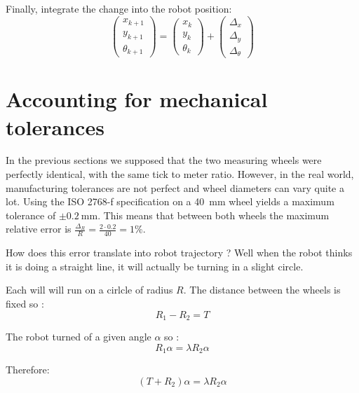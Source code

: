 \documentclass[a4paper]{paper}
\begin{document}
Finally, integrate the change into the robot position:
\begin{equation}
    \begin{pmatrix}
        x_{k+1}\\
        y_{k+1}\\
        \theta_{k+1}
    \end{pmatrix}
    =
    \begin{pmatrix}
        x_{k}\\
        y_{k}\\
        \theta_{k}
    \end{pmatrix}
    +
    \begin{pmatrix}
        \Delta_x\\\Delta_y\\\Delta_\theta
    \end{pmatrix}
\end{equation}


\section{Accounting for mechanical tolerances}
In the previous sections we supposed that the two measuring wheels were perfectly identical, with the same tick to meter ratio.
However, in the real world, manufacturing tolerances are not perfect and wheel diameters can vary quite a lot.
Using the ISO 2768-f specification on a \SI{40}{\milli\meter} wheel yields a maximum tolerance of $\pm \SI{0.2}{\milli\meter}$.
This means that between both wheels the maximum relative error is $\frac{\Delta_R}{R} = \frac{2 \cdot 0.2}{40} = 1\% $.

How does this error translate into robot trajectory ?
Well when the robot thinks it is doing a straight line, it will actually be turning in a slight circle.

Each will will run on a cirlcle of radius $R$.
The distance between the wheels is fixed so :
\begin{equation*}
    R_1 - R_2 = T
\end{equation*}

The robot turned of a given angle $\alpha$ so :
\begin{equation*}
    R_1 \alpha = \lambda R_2 \alpha
\end{equation*}

Therefore:
\begin{equation*}
    (T + R_2) \alpha = \lambda R_2 \alpha
\end{equation*}
\end{document}
